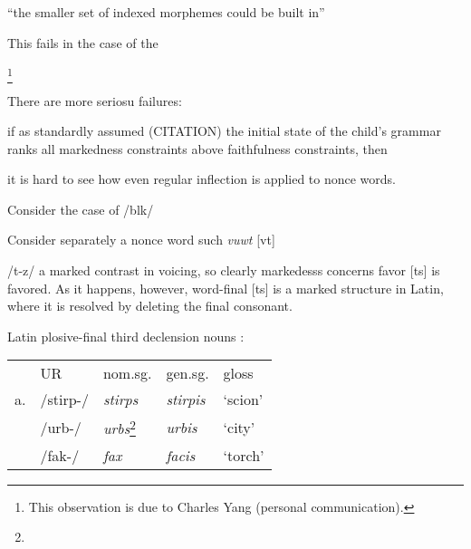 
\citep{Pater2000,Pater2005b,Pater2005a,Pater2006,Pater2009,Becker2009a}

``the smaller set of indexed morphemes could be built in'' \citep[][?]{Pater2009}

This fails in the case of the 



\footnote{This observation is due to Charles Yang (personal communication).}

There are more seriosu failures:

if as standardly assumed 
(CITATION)
the initial state of the child's grammar ranks all markedness constraints above faithfulness constraints, then 

it is hard to see how even regular inflection is applied to nonce words.

Consider the case of 
/bl\textsci k/

Consider separately a nonce word such 
\emph{vuwt} [v\textupsilon t]

/t-z/
a marked contrast in voicing, so clearly markedesss concerns favor [ts] is favored. As it happens, however, word-final [ts] is a marked structure in Latin,
where it is resolved by deleting the final consonant.

\ex \label{para} Latin plosive-final third declension nouns \citep[from][]{Gorman2011b}: 

\begin{tabular}{ r l l l l}
       & \textsc{UR}  & {nom.sg.} & {gen.sg.}         & {gloss} \\ \cmidrule{2-5}
    a. & /stirp-/   & \emph{stirps}   & \emph{stirpis}  & `scion'  \\
       & /urb-/     & \emph{urbs}\footnote{}   & \emph{urbis}    & `city'   \\
       & /fak-/     & \emph{fax}   & \emph{facis}    & `torch' \\
\end{tabular} \xe





